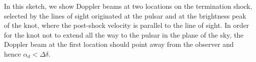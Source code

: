 In this sketch, we show Doppler beams at two locations on the
termination shock, selected by the lines of sight originated at the pulsar and at
the brightness peak of the knot, where the post-shock velocity is parallel to the
line of sight. In order for the knot not to extend all the way to the pulsar in the
plane of the sky, the Doppler beam at the first location should point away from
the observer and hence $\alpha_d<\Delta\delta$.